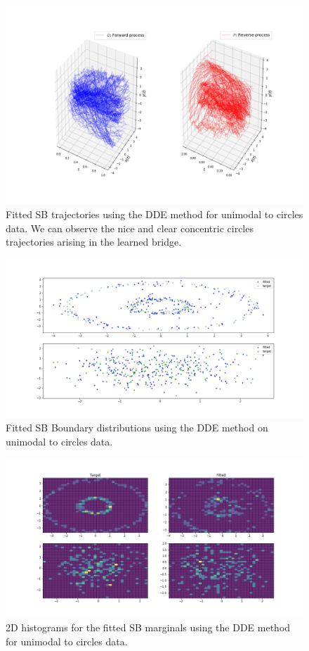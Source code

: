 \documentclass[a4paper,12pt,twoside,openright]{report}
\theoremstyle{definition}
\begin{document}
\begin{figure}
    \centering
    \includegraphics[scale=0.4,trim={5.3cm 2cm 2.5cm 0}, clip]{images/GP/gp_circles_trajectories_200_big.png}
    \caption{ Fitted SB trajectories using the DDE method for unimodal to circles data.  We can observe the nice and clear concentric circles trajectories arising in the learned bridge. }
    \label{fig:circ2d200trajectroies2d}
\end{figure}
\begin{figure}
    \centering
    \includegraphics[scale=0.4,trim={2.3cm 1cm 3.5cm 0}, clip]{images/GP/gp_circles_scatter_200_big_.png}
    \caption{ Fitted SB Boundary distributions using the DDE method on unimodal to circles data.}
    \label{fig:circ2d200scatter2d}
\end{figure}
\begin{figure}
    \centering
    \includegraphics[scale=0.4,trim={2.3cm 1cm 2.5cm 0}, clip]{images/GP/gp_circles_hist_200_big.png}
    \caption{ 2D histograms for the fitted SB marginals using the DDE method for unimodal to circles data.}
    \label{fig:circ2d20hist2d}
\end{figure}
\end{document}
